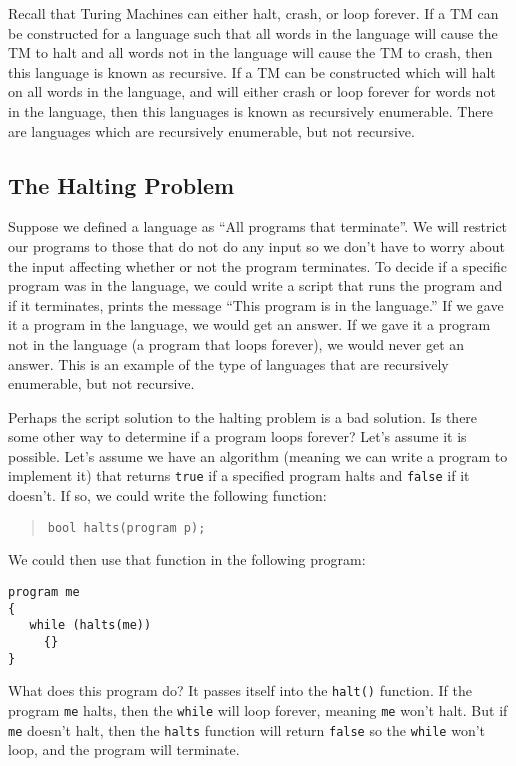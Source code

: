 \documentclass[letterpaper,12pt,openany,reqno]{book}%
\newcommand{\code}[1] {\lstinline[breaklines=yes,breakatwhitespace=yes]{#1}}
\begin{document}
Recall that Turing Machines can either halt, crash, or loop forever. If a TM can be constructed for a language such that all words in the language will cause the TM to halt and all words not in the language will cause the TM to crash, then this language is known as recursive. If a TM can be constructed which will halt on all words in the language, and will either crash or loop forever for words not in the language, then this languages is known as recursively enumerable. There are languages which are recursively enumerable, but not recursive. 

\subsection{The Halting Problem}
Suppose we defined a language as ``All programs that terminate''. We will restrict our programs to those that do not do any input so we don't have to worry about the input affecting whether or not the program terminates. To decide if a specific program was in the language, we could write a script that runs the program and if it terminates, prints the message ``This program is in the language.'' If we gave it a program in the language, we would get an answer. If we gave it a program not in the language (a program that loops forever), we would never get an answer. This is an example of the type of languages that are recursively enumerable, but not recursive.

Perhaps the script solution to the halting problem is a bad solution. Is there some other way to determine if a program loops forever? Let's assume it is possible. Let's assume we have an algorithm (meaning we can write a program to implement it) that returns \code{true} if a specified program halts and \code{false} if it doesn't. If so, we could write the following function:
\begin{quote}
\code{bool halts(program p);}
\end{quote}
We could then use that function in the following program:
\begin{lstlisting}[caption={Halting Problem program},label=L.halting]
program me
{
   while (halts(me))
	 {}
}
\end{lstlisting}
What does this program do? It passes itself into the \code{halt()} function. If the program \code{me} halts, then the \code{while} will loop forever, meaning \code{me} won't halt. But if \code{me} doesn't halt, then the \code{halts} function will return \code{false} so the \code{while} won't loop, and the program will terminate.
\end{document}
